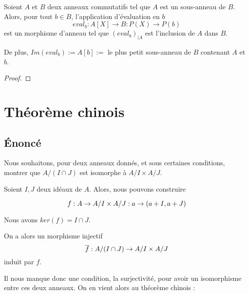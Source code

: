 \begin{proposition}
	Soient $A$ et $B$ deux anneaux commutatifs tel que $A$ est un sous-anneau de
	$B$. Alors, pour tout $b \in B$, l'application d'évaluation en $b$
	\begin{equation}
		eval_{b} : A[X] \rightarrow B : P(X) \rightarrow P(b)
	\end{equation}
	est un morphisme d'anneau tel que ${(eval_{b})}_{|A}$ est
	l'inclusion de $A$ dans $B$.
	
	De plus, $Im(eval_{b}) := A[b] := $ le plus petit sous-anneau de $B$
	contenant $A$ et $b$. %
\end{proposition}

\ifdefined\outputproof
\begin{proof}

\end{proof}
\fi


\section{Théorème chinois}


\subsection{Énoncé}
Nous souhaitons, pour deux anneaux donnés, et sous certaines conditions, montrer
que $A/(I \cap J)$ est isomorphe à $A/I \times A/J$.

Soient $I, J$ deux idéaux de $A$. Alors, nous pouvons construire

\begin{equation}
	f : A \rightarrow A/I \times A/J : a \rightarrow (a + I, a + J)
\end{equation}

Nous avons $ker(f) = I \cap J$.

On a alors un morphisme injectif 
\begin{equation}
	\overline{f} : A/(I \cap J) \rightarrow A/I \times A/J
\end{equation}
induit par $f$.

Il nous manque donc une condition, la surjectivité, pour avoir un isomorphisme
entre ces deux anneaux.
On en vient alors au théorème chinois :

